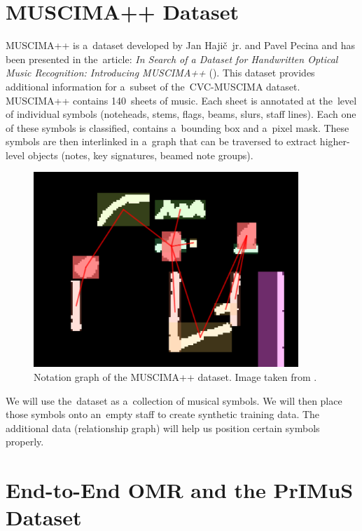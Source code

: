 \section{MUSCIMA++ Dataset}

MUSCIMA++ is a~dataset developed by Jan Hajič~jr. and Pavel Pecina and has been presented in the~article: \emph{In Search of a Dataset for Handwritten Optical Music Recognition: Introducing MUSCIMA++} (\cite{MuscimaPP}). This dataset provides additional information for a~subset of the~CVC-MUSCIMA dataset. MUSCIMA++ contains 140~sheets of music. Each sheet is annotated at the~level of individual symbols (noteheads, stems, flags, beams, slurs, staff lines). Each one of these symbols is classified, contains a~bounding box and a~pixel mask. These symbols are then interlinked in a~graph that can be traversed to extract higher-level objects (notes, key signatures, beamed note groups).

\begin{figure}[h]
    \centering
    \includegraphics[width=100mm]{../img/muscima-pp}
    \caption{Notation graph of the MUSCIMA++ dataset. Image taken from \cite{MuscimaPP}.}
    \label{fig2:MuscimaPP}
\end{figure}

We will use the~dataset as a~collection of musical symbols. We will then place those symbols onto an~empty staff to create synthetic training data. The additional data (relationship graph) will help us position certain symbols properly.


\section{End-to-End OMR and the PrIMuS Dataset}

